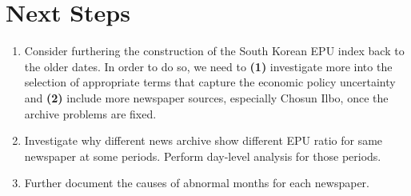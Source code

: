 \section{Next Steps}
\begin{enumerate}
\item Consider furthering the construction of the South Korean EPU index back to the older dates. In order to do so, we need to \textbf{(1)} investigate more into the selection of appropriate terms that capture the economic policy uncertainty and \textbf{(2)} include more newspaper sources, especially Chosun Ilbo, once the archive problems are fixed.
\item Investigate why different news archive show different EPU ratio for same newspaper at some periods. Perform day-level analysis for those periods. 
\item Further document the causes of abnormal months for each newspaper. 
\end{enumerate}

\clearpage


